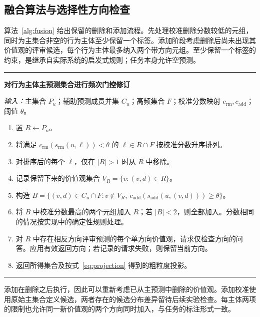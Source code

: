 \documentclass[12pt,a4paper]{article}
\begin{document}
\subsection{融合算法与选择性方向检查}
算法~\ref{alg:fusion} 给出保留的删除和添加流程。先处理校准删除分数较低的元组，同时为主集合非空的行为主体至少保留一个标签。添加阶段考虑删除后尚未出现其价值观的评审候选，每个行为主体最多纳入两个带方向元组。至少保留一个标签的约束，是继承自实际系统的启发式规则；任务本身允许空预测。

\begin{algorithm}[htbp]
\centering
\begin{minipage}{0.96\textwidth}\small
\hrule\vspace{6pt}
\textbf{对行为主体主预测集合进行频次门控修订}\par
\textit{输入：}主集合 $P_u$；辅助预测成员并集 $C_u$；高频集合 $F$；校准分数映射 $c_{\mathrm{rm}},c_{\mathrm{add}}$；阈值 $\theta$。\par
\begin{enumerate}[label=\arabic*.,itemsep=4pt]
\item 置 $R\leftarrow P_u$。
\item 将满足 $c_{\mathrm{rm}}(s_{\mathrm{rm}}(u,\ell))<\theta$ 的 $\ell\in R\cap F$ 按校准分数升序排列。
\item 对排序后的每个 $\ell$，仅在 $|R|>1$ 时从 $R$ 中移除。
\item 记录保留下来的价值观集合 $V_R=\{v:(v,d)\in R\}$。
\item 构造 $B=\{(v,d)\in C_u\cap F:v\notin V_R,\ c_{\mathrm{add}}(s_{\mathrm{add}}(u,(v,d)))\geq\theta\}$。
\item 将 $B$ 中校准分数最高的两个元组加入 $R$；若 $|B|<2$，则全部加入。分数相同的情况按实现中的确定性规则处理。
\item 对 $R$ 中存在相反方向评审预测的每个单方向价值观，请求仅检查方向的问答。应用有效返回方向；若记录的请求失败，则保留当前方向。
\item 返回所得集合及按式~\eqref{eq:projection} 得到的粗粒度投影。
\end{enumerate}
\vspace{3pt}\hrule
\end{minipage}
\caption{部署时的决策逻辑。第~6 步使用第~4 步记录的价值观集合，可以纳入新添加价值观的两个方向。第~7 步失败时保留原方向，描述的是历史运行行为。}
\label{alg:fusion}
\end{algorithm}

添加在删除之后执行，因此可以重新考虑已从主预测中删除的价值观。添加校准使用原始主集合定义候选，两者存在的候选分布差异留待后续实验检查。每主体两项的限制也允许同一新价值观的两个方向同时加入，与任务的标注形式一致。
\end{document}
